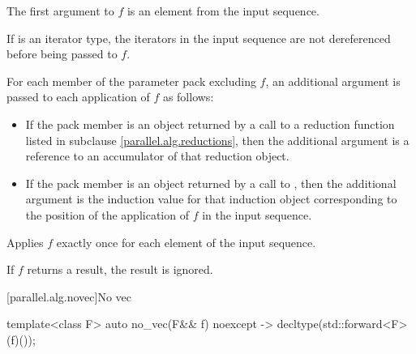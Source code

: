 \begin{itemdescr}
The first argument to $f$ is an element from the input sequence.\begin{note}If  is an iterator type, the iterators in the input sequence are not dereferenced before being passed to $f$.\end{note} For each member of the  parameter pack excluding $f$, an additional argument is passed to each application of $f$ as follows:

\begin{itemize}
\item If the pack member is an object returned by a call to a reduction function listed in subclause \ref{parallel.alg.reductions}, then the additional argument is a reference to an accumulator of that reduction object.

\item If the pack member is an object returned by a call to , then the additional argument is the induction value for that induction object corresponding to the position of the application of $f$ in the input sequence.
\end{itemize}

\pnum
\complexity Applies $f$ exactly once for each element of the input sequence.

\pnum
\remarks If $f$ returns a result, the result is ignored.

\end{itemdescr}

[parallel.alg.novec]{No vec}

\begin{itemdecl}
template<class F>
  auto no_vec(F&& f) noexcept -> decltype(std::forward<F>(f)());
\end{itemdecl}

